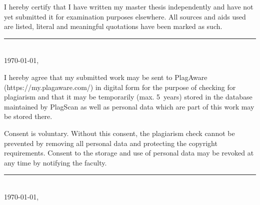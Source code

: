 

I hereby certify that I have written my master thesis independently and have not yet submitted it for examination purposes elsewhere.
All sources and aids used are listed, literal and meaningful quotations have been marked as such.

\vspace{40pt}
\begin{flushright}
  \rule{5cm}{0.4pt}\\
  \today, \ShowThesisAuthor    
\end{flushright}


I hereby agree that my submitted work may be sent to PlagAware (https://my.plagaware.com/) in digital form for the purpose of checking for plagiarism and that it may be temporarily (max. 5~years) stored in the database maintained by PlagScan as well as personal data which are part of this work may be stored there.

\begin{small}
Consent is voluntary.
Without this consent, the plagiarism check cannot be prevented by removing all personal data and protecting the copyright requirements.
Consent to the storage and use of personal data may be revoked at any time by notifying the faculty.
\end{small}

\begin{flushright}
  \rule{5cm}{0.4pt}\\
  \today, \ShowThesisAuthor    
\end{flushright}